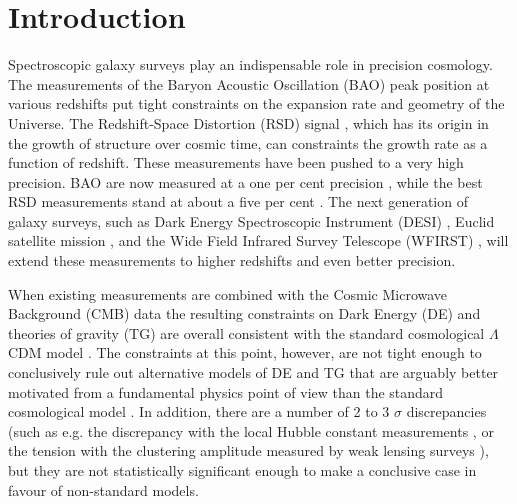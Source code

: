 


\section{Introduction} %
Spectroscopic galaxy surveys play an indispensable role in precision cosmology.
The measurements of the Baryon Acoustic Oscillation (BAO) peak position
\cite{2010deot.book..246B} at
various redshifts put tight constraints on the expansion rate and geometry of
the Universe. The Redshift-Space Distortion (RSD) signal \cite{2007MNRAS.378.1196K,1998ASSL..231..185H}, which has its origin
in the growth of structure over cosmic time, can constraints the growth rate
as a function of redshift. These measurements have been pushed to a very
high precision. BAO are now measured at a one per cent precision
\cite{2017MNRAS.470.2617A},  while the best RSD measurements stand at about a
five per cent 
\cite{2017MNRAS.467.2085G,2017MNRAS.464.1640S,2017MNRAS.469.1369S,2017MNRAS.466.2242B}.
The next generation of galaxy surveys, such as Dark Energy Spectroscopic
Instrument (DESI) \cite{2016arXiv161100036D}, Euclid satellite mission
\cite{2011arXiv1110.3193L}, and the Wide Field Infrared Survey Telescope
(WFIRST) \cite{2015arXiv150303757S}, will extend these measurements to higher
redshifts and even better precision.

When existing measurements are combined with the Cosmic Microwave Background (CMB)
data the resulting constraints on Dark Energy (DE) and theories of gravity
(TG) are overall consistent with the standard cosmological $\Lambda$CDM model
\cite{2018arXiv180706209P}.  The constraints at this point, however, are not
tight enough to conclusively rule out alternative models of DE and TG that are
arguably better motivated from a fundamental physics point of view than the
standard cosmological model \cite{2003RvMP...75..559P}. In addition, there are a number of 2 to 3 $\sigma$
discrepancies (such as e.g.  the discrepancy with the local Hubble constant
measurements \cite{2018JCAP...09..025M}, or the tension with the clustering
amplitude measured by weak lensing surveys \cite{2018MNRAS.476.2999M}), but
they are not statistically significant enough to make a conclusive case in
favour of non-standard models.
 
